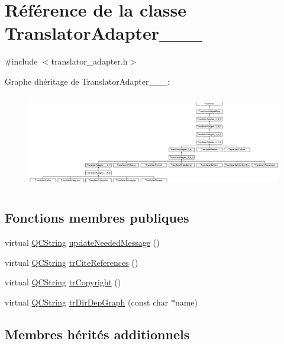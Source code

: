 \hypertarget{class_translator_adapter__1__7__5}{}\section{Référence de la classe Translator\+Adapter\+\_\+\_\+\_}
\label{class_translator_adapter__1__7__5}


{\ttfamily \#include $<$translator\+\_\+adapter.\+h$>$}

Graphe d\textquotesingle{}héritage de Translator\+Adapter\+\_\+\_\+\_\+:\begin{figure}[H]
\begin{center}
\leavevmode
\includegraphics[height=4.173441cm]{class_translator_adapter__1__7__5}
\end{center}
\end{figure}
\subsection*{Fonctions membres publiques}
\begin{DoxyCompactItemize}
\item 
virtual \hyperlink{class_q_c_string}{Q\+C\+String} \hyperlink{class_translator_adapter__1__7__5_a6e69d48e79a13c9d934f9af1a8befd8a}{update\+Needed\+Message} ()
\item 
virtual \hyperlink{class_q_c_string}{Q\+C\+String} \hyperlink{class_translator_adapter__1__7__5_ab4ade1617a97ef1340201d5e551c355b}{tr\+Cite\+References} ()
\item 
virtual \hyperlink{class_q_c_string}{Q\+C\+String} \hyperlink{class_translator_adapter__1__7__5_ae43b0f966bbfa1ee7fafcc2bd4d22b22}{tr\+Copyright} ()
\item 
virtual \hyperlink{class_q_c_string}{Q\+C\+String} \hyperlink{class_translator_adapter__1__7__5_a3bf65b69eeddae154b563b0d7a373232}{tr\+Dir\+Dep\+Graph} (const char $\ast$name)
\end{DoxyCompactItemize}
\subsection*{Membres hérités additionnels}


